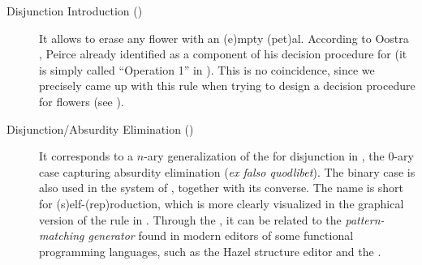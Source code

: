 \begin{description}
  \item[Disjunction Introduction ()]
    It allows to erase any flower with an \textsf{(e)}mpty \textsf{(pet)}al.
    According to Oostra \cite[p.~109]{oostra_advances_2022}, Peirce already
    identified  as a component of his decision procedure for
     (it is simply called ``Operation 1'' in
    \cite{oostra_advances_2022}). This is no coincidence, since we precisely
    came up with this rule when trying to design a decision procedure for
    flowers (see ).

  \item[Disjunction/Absurdity Elimination ()]
    It corresponds to a $n$-ary generalization of the  for disjunction in , the $0$-ary case capturing
    absurdity elimination (\textit{ex falso quodlibet}). The binary case is also
    used in the  system of \cite{minghui_graphical_2019}, together with
    its converse. The name  is short for
    \textsf{(s)}elf-\textsf{(rep)}roduction, which is more clearly visualized in
    the graphical version of the rule in . Through the
    , it can be related to the \emph{pattern-matching
    generator} found in modern editors of some functional programming languages,
    such as the Hazel structure editor and the  
    .
\end{description}

